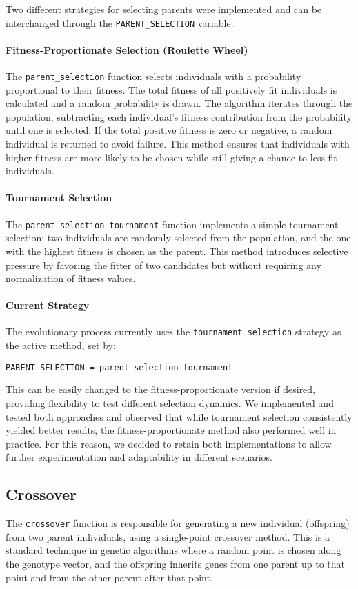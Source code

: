 \documentclass{article}
\begin{document}
Two different strategies for selecting parents were implemented and can be interchanged through the \texttt{PARENT\_SELECTION} variable.

\paragraph{Fitness-Proportionate Selection (Roulette Wheel)}
The \texttt{parent\_selection} function selects individuals with a probability proportional to their fitness. The total fitness of all positively fit individuals is calculated and a random probability is drawn. The algorithm iterates through the population, subtracting each individual's fitness contribution from the probability until one is selected. If the total positive fitness is zero or negative, a random individual is returned to avoid failure. This method ensures that individuals with higher fitness are more likely to be chosen while still giving a chance to less fit individuals.

\paragraph{Tournament Selection}
The \texttt{parent\_selection\_tournament} function implements a simple tournament selection: two individuals are randomly selected from the population, and the one with the highest fitness is chosen as the parent. This method introduces selective pressure by favoring the fitter of two candidates but without requiring any normalization of fitness values.

\paragraph{Current Strategy}
The evolutionary process currently uses the \texttt{tournament selection} strategy as the active method, set by:
\begin{verbatim}
PARENT_SELECTION = parent_selection_tournament
\end{verbatim}
This can be easily changed to the fitness-proportionate version if desired, providing flexibility to test different selection dynamics. We implemented and tested both approaches and observed that while tournament selection consistently yielded better results, the fitness-proportionate method also performed well in practice. For this reason, we decided to retain both implementations to allow further experimentation and adaptability in different scenarios.

\subsection{Crossover}
The \texttt{crossover} function is responsible for generating a new individual (offspring) from two parent individuals, using a single-point crossover method. This is a standard technique in genetic algorithms where a random point is chosen along the genotype vector, and the offspring inherits genes from one parent up to that point and from the other parent after that point.
\end{document}
